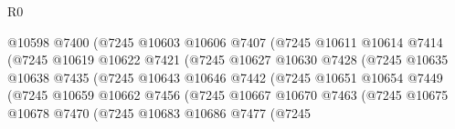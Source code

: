\begin{lexlean}{R0}
\begin{coremodule}
                                      @10598
                                      @7400
                                      (@7245
                                        @10603
                                        @10606
                                        @7407
                                        (@7245
                                          @10611
                                          @10614
                                          @7414
                                          (@7245
                                            @10619
                                            @10622
                                            @7421
                                            (@7245
                                              @10627
                                              @10630
                                              @7428
                                              (@7245
                                                @10635
                                                @10638
                                                @7435
                                                (@7245
                                                  @10643
                                                  @10646
                                                  @7442
                                                  (@7245
                                                    @10651
                                                    @10654
                                                    @7449
                                                    (@7245
                                                      @10659
                                                      @10662
                                                      @7456
                                                      (@7245
                                                        @10667
                                                        @10670
                                                        @7463
                                                        (@7245
                                                          @10675
                                                          @10678
                                                          @7470
                                                          (@7245
                                                            @10683
                                                            @10686
                                                            @7477
                                                            (@7245

\end{coremodule}
\end{lexlean}
